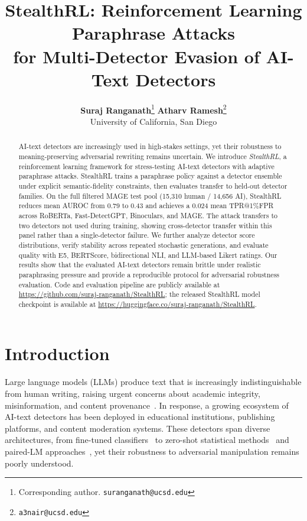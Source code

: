 \documentclass[11pt]{article}
\title{\textbf{StealthRL: Reinforcement Learning Paraphrase Attacks\\for Multi-Detector Evasion of AI-Text Detectors}}
\author{
  \textbf{Suraj Ranganath}\thanks{Corresponding author. \texttt{suranganath@ucsd.edu}} \quad
  \textbf{Atharv Ramesh}\thanks{\texttt{a3nair@ucsd.edu}} \\[4pt]
  University of California, San Diego
}
\date{}
\begin{document}
\maketitle

\begin{abstract}
\sloppy
AI-text detectors are increasingly used in high-stakes settings, yet their robustness to meaning-preserving adversarial rewriting remains uncertain. We introduce \emph{StealthRL}, a reinforcement learning framework for stress-testing AI-text detectors with adaptive paraphrase attacks. StealthRL trains a paraphrase policy against a detector ensemble under explicit semantic-fidelity constraints, then evaluates transfer to held-out detector families. On the full filtered MAGE test pool (15,310 human / 14,656 AI), StealthRL reduces mean AUROC from 0.79 to 0.43 and achieves a 0.024 mean TPR@1\%FPR across RoBERTa, Fast-DetectGPT, Binoculars, and MAGE. The attack transfers to two detectors not used during training, showing cross-detector transfer within this panel rather than a single-detector failure. We further analyze detector score distributions, verify stability across repeated stochastic generations, and evaluate quality with E5, BERTScore, bidirectional NLI, and LLM-based Likert ratings. Our results show that the evaluated AI-text detectors remain brittle under realistic paraphrasing pressure and provide a reproducible protocol for adversarial robustness evaluation. Code and evaluation pipeline are publicly available at \url{https://github.com/suraj-ranganath/StealthRL}; the released StealthRL model checkpoint is available at \url{https://huggingface.co/suraj-ranganath/StealthRL}.
\end{abstract}

\section{Introduction}
\label{sec:intro}

Large language models (LLMs) produce text that is increasingly indistinguishable from human writing, raising urgent concerns about academic integrity, misinformation, and content provenance~\cite{solaiman2019release}. In response, a growing ecosystem of AI-text detectors has been deployed in educational institutions, publishing platforms, and content moderation systems. These detectors span diverse architectures, from fine-tuned classifiers~\cite{solaiman2019release} to zero-shot statistical methods~\cite{mitchell2023detectgptzeroshotmachinegeneratedtext, bao2024fastdetectgptefficientzeroshotdetection} and paired-LM approaches~\cite{hans2024spottingllmsbinocularszeroshot}, yet their robustness to adversarial manipulation remains poorly understood.
\end{document}
